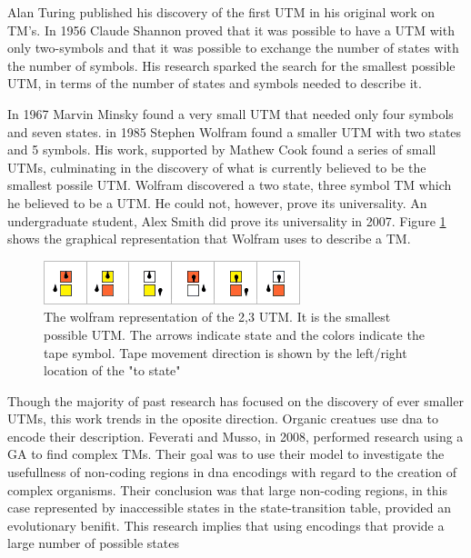 Alan Turing published his discovery of the first UTM in his original work on TM's. \cite{turing} In 1956 Claude Shannon proved that it was possible to have a UTM with only two-symbols and that it was possible to exchange the number of states with the number of symbols. \cite{two_states} His research sparked the search for the smallest possible UTM, in terms of the number of states and symbols needed to describe it. 

In 1967 Marvin Minsky found a very small UTM that needed only four symbols and seven states. \cite{minsky} in 1985 Stephen Wolfram found a smaller UTM with two states and 5 symbols. \cite{wolfram} His work, supported by Mathew Cook found a series of small UTMs, culminating in the discovery of what is currently believed to be the smallest possile UTM. Wolfram discovered a two state, three symbol TM which he believed to be a UTM. He could not, however, prove its universality. An undergraduate student, Alex Smith did prove its universality in 2007. Figure \ref{fig:23turing} shows the graphical representation that Wolfram uses to describe a TM. \cite{23turing}

\begin{figure}[!htp]
  \centering
  \includegraphics[width=.85\textwidth]{images/23_machine}
  \caption{The wolfram representation of the 2,3 UTM. It is the smallest possible UTM. The arrows indicate state and the colors indicate the tape symbol. Tape movement direction is shown by the left/right location of the "to state" \label{fig:23turing} }
\end{figure}

Though the majority of past research has focused on the discovery of ever smaller UTMs, this work trends in the oposite direction. Organic creatues use dna to encode their description. Feverati and Musso, in 2008, performed research using a GA to find complex TMs. Their goal was to use their model to investigate the usefullness of non-coding regions in dna encodings with regard to the creation of complex organisms. Their conclusion was that large non-coding regions, in this case represented by inaccessible states in the state-transition table, provided an evolutionary benifit.\cite{feverati-2007} This research implies that using encodings that provide a large number of possible states 